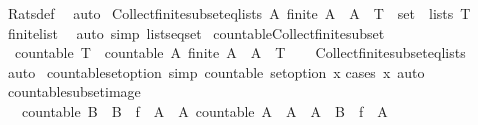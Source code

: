 \begin{isabellebody}
\ Rats{\isacharunderscore}def\ \isamarkupfalse%
\ auto%
\endisatagproof
{\isafoldproof}%
%
\isadelimproof
\isanewline
%
\endisadelimproof
\isanewline
{}\isamarkupfalse%
\ Collect{\isacharunderscore}finite{\isacharunderscore}subset{\isacharunderscore}eq{\isacharunderscore}lists{\isacharcolon}\ {\isachardoublequoteopen}{\isacharbraceleft}A{\isachardot}\ finite\ A\ {\isasymand}\ A\ {\isasymsubseteq}\ T{\isacharbraceright}\ {\isacharequal}\ set\ {\isacharbackquote}\ lists\ T{\isachardoublequoteclose}\isanewline
%
\isadelimproof
\ \ %
\endisadelimproof
%
\isatagproof
{}\isamarkupfalse%
\ finite{\isacharunderscore}list\ \isamarkupfalse%
\ {\isacharparenleft}auto\ simp{\isacharcolon}\ lists{\isacharunderscore}eq{\isacharunderscore}set{\isacharparenright}%
\endisatagproof
{\isafoldproof}%
%
\isadelimproof
\isanewline
%
\endisadelimproof
\isanewline
{}\isamarkupfalse%
\ countable{\isacharunderscore}Collect{\isacharunderscore}finite{\isacharunderscore}subset{\isacharcolon}\isanewline
\ \ {\isachardoublequoteopen}countable\ T\ {\isasymLongrightarrow}\ countable\ {\isacharbraceleft}A{\isachardot}\ finite\ A\ {\isasymand}\ A\ {\isasymsubseteq}\ T{\isacharbraceright}{\isachardoublequoteclose}\isanewline
%
\isadelimproof
\ \ %
\endisadelimproof
%
\isatagproof
{}\isamarkupfalse%
\ Collect{\isacharunderscore}finite{\isacharunderscore}subset{\isacharunderscore}eq{\isacharunderscore}lists\ \isamarkupfalse%
\ auto%
\endisatagproof
{\isafoldproof}%
%
\isadelimproof
\isanewline
%
\endisadelimproof
\isanewline
{}\isamarkupfalse%
\ countable{\isacharunderscore}set{\isacharunderscore}option\ {\isacharbrackleft}simp{\isacharbrackright}{\isacharcolon}\ {\isachardoublequoteopen}countable\ {\isacharparenleft}set{\isacharunderscore}option\ x{\isacharparenright}{\isachardoublequoteclose}\isanewline
%
\isadelimproof
%
\endisadelimproof
%
\isatagproof
{}\isamarkupfalse%
{\isacharparenleft}cases\ x{\isacharparenright}\ auto%
\endisatagproof
{\isafoldproof}%
%
\isadelimproof
%
\endisadelimproof
%
\isadelimdocument
%
\endisadelimdocument
%
\isatagdocument
%
\isamarkuptrue%
%
\endisatagdocument
{\isafolddocument}%
%
\isadelimdocument
%
\endisadelimdocument
{}\isamarkupfalse%
\ countable{\isacharunderscore}subset{\isacharunderscore}image{\isacharcolon}\isanewline
\ \ \ {\isachardoublequoteopen}countable\ B\ {\isasymand}\ B\ {\isasymsubseteq}\ {\isacharparenleft}f\ {\isacharbackquote}\ A{\isacharparenright}\ {\isasymlongleftrightarrow}\ {\isacharparenleft}{\isasymexists}A{\isacharprime}{\isachardot}\ countable\ A{\isacharprime}\ {\isasymand}\ A{\isacharprime}\ {\isasymsubseteq}\ A\ {\isasymand}\ {\isacharparenleft}B\ {\isacharequal}\ f\ {\isacharbackquote}\ A{\isacharprime}{\isacharparenright}{\isacharparenright}{\isachardoublequoteclose}\isanewline

\end{isabellebody}
